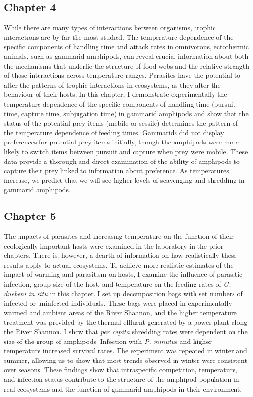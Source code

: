 \subsection{Chapter 4}
While there are many types of interactions between organisms, trophic interactions are by far the most studied. The temperature-dependence of the specific components of handling time and attack rates in omnivorous, ectothermic animals, such as gammarid amphipods, can reveal crucial information about both the mechanisms that underlie the structure of food webs and the relative strength of those interactions across temperature ranges. Parasites have the potential to alter the patterns of trophic interactions in ecosystems, as they alter the behaviour of their hosts. In this chapter, I demonstrate experimentally the temperature-dependence of the specific components of handling time (pursuit time, capture time, subjugation time) in gammarid amphipods and show that the status of the potential prey items (mobile or sessile) determines the pattern of the temperature dependence of feeding times.  Gammarids did not display preferences for potential prey items initially, though the amphipods were more likely to switch items between pursuit and capture when prey were mobile.  These data provide a thorough and direct examination of the ability of amphipods to capture their prey linked to information about preference. As temperatures increase, we predict that we will see higher levels of scavenging and shredding in gammarid amphipods. 

\subsection{Chapter 5}
The impacts of parasites and increasing temperature on the function of their ecologically important hosts were examined in the laboratory in the prior chapters. There is, however, a dearth of information on how realistically these results apply to actual ecosystems. To achieve more realistic estimates of the impact of warming and parasitism on hosts, I examine the influence of parasitic infection, group size of the host, and temperature on the feeding rates of \emph{G. duebeni in situ} in this chapter. I set up decomposition bags with set numbers of infected or uninfected individuals. These bags were placed in experimentally warmed and ambient areas of the River Shannon, and the higher temperature treatment was provided by the thermal effluent generated by a power plant along the River Shannon. I show that \emph{per capita} shredding rates were dependent on the size of the group of amphipods. Infection with \emph{P. minutus} and higher temperature increased survival rates. The experiment was repeated in winter and summer, allowing us to show that most trends observed in winter were consistent over seasons. These findings show that intraspecific competition, temperature, and infection status contribute to the structure of the amphipod population in real ecosystems and the function of gammarid amphipods in their environment. 

